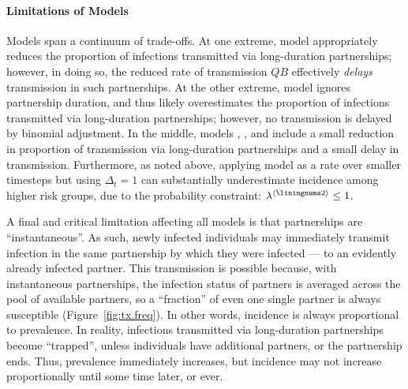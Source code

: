\paragraph{Limitations of Models }
Models  span a continuum of trade-offs.
At one extreme, model  appropriately reduces the proportion of infections
transmitted via long-duration partnerships;
however, in doing so, the reduced rate of transmission $QB$
effectively \emph{delays} transmission in such partnerships.
At the other extreme, model  ignores partnership duration,
and thus likely overestimates the proportion of infections
transmitted via long-duration partnerships;
however, no transmission is delayed by binomial adjustment.
In the middle, models , , and  include
a small reduction in proportion of transmission via long-duration partnerships
and a small delay in transmission.
Furthermore, as noted above,
applying model  as a rate over smaller timesteps but using $\Delta_t = 1$
can substantially underestimate incidence among higher risk groups,
due to the probability constraint: $\lambda^{\case{2}} \le 1$.
\par
A final and critical limitation affecting all models 
is that partnerships are ``instantaneous''.
As such, newly infected individuals may immediately transmit infection
in the same partnership by which they were infected --- to an evidently already infected partner.
This transmission is possible because, with instantaneous partnerships,
the infection status of partners is averaged across the pool of available partners,
so a ``fraction'' of even one single partner is always susceptible (Figure~\ref{fig:tx.freq}).
In other words, incidence is always proportional to prevalence.
In reality, infections transmitted via long-duration partnerships become ``trapped'',
unless individuals have additional partners, or the partnership ends.
Thus, prevalence immediately increases,
but incidence may not increase proportionally until some time later, or ever.
